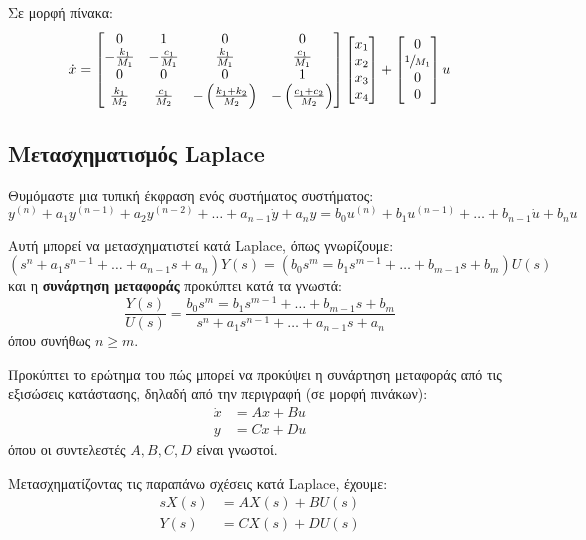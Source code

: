 \documentclass[11pt,a4paper,notitlepage,fleqn]{article}
\begin{document}
\begin{exercise}
	Σε μορφή πίνακα:
	\[
	\dot x = \left[\begin{matrix}
	0 & 1 & 0 & 0\\
	-\frac{k_1}{M_1} & -\frac{c_1}{M_1} & \frac{k_1}{M_1} & \frac{c_1}{M_1}\\
	0 & 0 & 0 & 1\\
	\frac{k_1}{M_2} & \frac{c_1}{M_2} & -\left(\frac{k_1+k_2}{M_2}\right)
	& -\left(\frac{c_1+c_2}{M_2}\right)
	\end{matrix}\right]\left[\begin{matrix}
	x_1 \\ x_2 \\ x_3 \\ x_4
	\end{matrix}\right] + \left[
	\begin{matrix}
	0 \\ \sfrac{1}{M_1} \\ 0 \\ 0
	\end{matrix}
	\right]u
	\]
\end{exercise}

\subsection{Μετασχηματισμός Laplace}
Θυμόμαστε μια τυπική έκφραση ενός συστήματος συστήματος:
\[
y^{(n)} + a_1y^{(n-1)} + a_2y^{(n-2)} + \dots + a_{n-1}\dot y + a_n y =
b_0 u^{(n)} + b_1u^{(n-1)} + \dots + b_{n-1}\dot u + b_n u
\]

Αυτή μπορεί να μετασχηματιστεί κατά Laplace, όπως γνωρίζουμε:
\[
\left(
s^n + a_1s^{n-1} + \dots + a_{n-1}s + a_n
\right)Y(s) = \left(
b_0s^m = b_1s^{m-1} + \dots + b_{m-1}s+b_m
\right)U(s)
\]
και η \textbf{συνάρτηση μεταφοράς} προκύπτει κατά τα γνωστά:
\[
\frac{Y(s)}{U(s)} = \frac{
	b_0s^m = b_1s^{m-1} + \dots + b_{m-1}s+b_m
	}{
	s^n + a_1s^{n-1} + \dots + a_{n-1}s + a_n
	}
\] όπου συνήθως \( n \geq m \).

Προκύπτει το ερώτημα του πώς μπορεί να προκύψει η συνάρτηση μεταφοράς από τις εξισώσεις
κατάστασης, δηλαδή από την περιγραφή (σε μορφή πινάκων):
\begin{align*}
\dot x &= Ax	+ Bu\\
y &= Cx + Du
\end{align*}
όπου οι συντελεστές \( A,B,C,D \) είναι γνωστοί.

Μετασχηματίζοντας τις παραπάνω σχέσεις κατά Laplace, έχουμε:
\begin{align*}
	sX(s) &= AX(s) + BU(s) \\
	Y(s) &= CX(s) + DU(s)
\end{align*}
\end{document}
